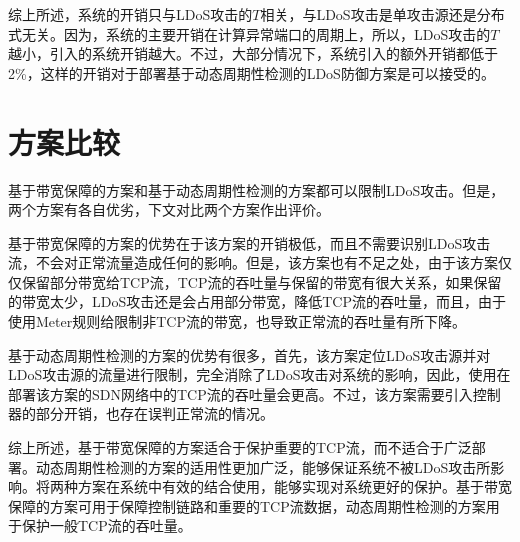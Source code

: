 综上所述，系统的开销只与LDoS攻击的$T$相关，与LDoS攻击是单攻击源还是分布式无关。因为，系统的主要开销在计算异常端口的周期上，所以，LDoS攻击的$T$越小，引入的系统开销越大。不过，大部分情况下，系统引入的额外开销都低于2\%，这样的开销对于部署基于动态周期性检测的LDoS防御方案是可以接受的。


\section{方案比较}
\label{chap05:compare}

基于带宽保障的方案和基于动态周期性检测的方案都可以限制LDoS攻击。但是，两个方案有各自优劣，下文对比两个方案作出评价。

基于带宽保障的方案的优势在于该方案的开销极低，而且不需要识别LDoS攻击流，不会对正常流量造成任何的影响。但是，该方案也有不足之处，由于该方案仅仅保留部分带宽给TCP流，TCP流的吞吐量与保留的带宽有很大关系，如果保留的带宽太少，LDoS攻击还是会占用部分带宽，降低TCP流的吞吐量，而且，由于使用Meter规则给限制非TCP流的带宽，也导致正常流的吞吐量有所下降。

基于动态周期性检测的方案的优势有很多，首先，该方案定位LDoS攻击源并对LDoS攻击源的流量进行限制，完全消除了LDoS攻击对系统的影响，因此，使用在部署该方案的SDN网络中的TCP流的吞吐量会更高。不过，该方案需要引入控制器的部分开销，也存在误判正常流的情况。

综上所述，基于带宽保障的方案适合于保护重要的TCP流，而不适合于广泛部署。动态周期性检测的方案的适用性更加广泛，能够保证系统不被LDoS攻击所影响。将两种方案在系统中有效的结合使用，能够实现对系统更好的保护。基于带宽保障的方案可用于保障控制链路和重要的TCP流数据，动态周期性检测的方案用于保护一般TCP流的吞吐量。